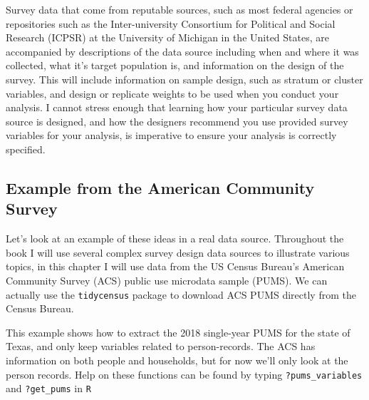 \documentclass[
]{article}
\begin{document}
Survey data that come from reputable sources, such as most federal agencies or repositories such as the Inter-university Consortium for Political and Social Research (ICPSR) at the University of Michigan in the United States, are accompanied by descriptions of the data source including when and where it was collected, what it's target population is, and information on the design of the survey. This will include information on sample design, such as stratum or cluster variables, and design or replicate weights to be used when you conduct your analysis. I cannot stress enough that learning how your particular survey data source is designed, and how the designers recommend you use provided survey variables for your analysis, is imperative to ensure your analysis is correctly specified.

\hypertarget{example-from-the-american-community-survey}{%
\subsection{Example from the American Community Survey}\label{example-from-the-american-community-survey}}

Let's look at an example of these ideas in a real data source. Throughout the book I will use several complex survey design data sources to illustrate various topics, in this chapter I will use data from the US Census Bureau's American Community Survey (ACS) public use microdata sample (PUMS). We can actually use the \texttt{tidycensus} package \citep{walker21} to download ACS PUMS directly from the Census Bureau.

This example shows how to extract the 2018 single-year PUMS for the state of Texas, and only keep variables related to person-records. The ACS has information on both people and households, but for now we'll only look at the person records. Help on these functions can be found by typing \texttt{?pums\_variables} and \texttt{?get\_pums} in \texttt{R}
\end{document}

